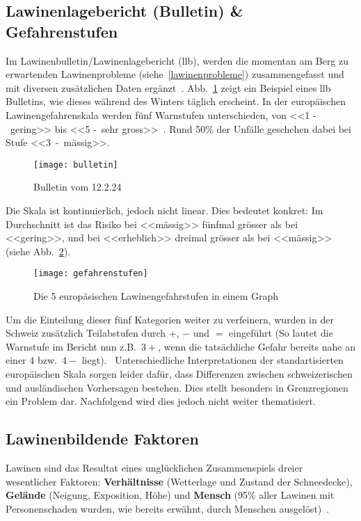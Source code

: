\subsection{Lawinenlagebericht (Bulletin) \& Gefahrenstufen}

Im Lawinenbulletin/Lawinenlagebericht (\gls{llb}), werden die momentan am Berg zu erwartenden Lawinenprobleme (siehe~\ref{lawinenprobleme}) zusammengefasst und mit diversen zusätzlichen Daten ergänzt~\cite{lawinengefskala}.
Abb.\ \ref{fig:bulletin} zeigt ein Beispiel eines \gls{llb} Bulletins, wie dieses während des Winters täglich erscheint.
In der europäischen Lawinengefahrenskala werden fünf Warnstufen unterschieden, von <<1 -~gering>> bis <<5 -~sehr gross>>~\cite{harveyrhynerschweizerlawinenkunde}\cite{lawinengefskala}.
Rund 50\% der Unfälle geschehen dabei bei Stufe <<3~-~mässig>>.~\cite{achtunglawine}
\begin{figure}[H]
  \centering
  \texttt{[image: bulletin]}
  \caption{Bulletin vom 12.2.24~\cite{slfarchiv}}\label{fig:bulletin}
\end{figure}
Die Skala ist kontinuierlich, jedoch nicht linear. Dies bedeutet konkret: 
Im Durchschnitt ist das Risiko bei <<mässig>> fünfmal grösser als bei <<gering>>, und bei <<erheblich>> dreimal grösser als bei <<mässig>>~\cite{sacbergspwinter} (siehe Abb.\ \ref{fig:llbdanger}).
\begin{figure}[H]
  \centering
  \texttt{[image: gefahrenstufen]}
  \caption{Die 5 europäsischen Lawinengefahrstufen in einem Graph}\label{fig:llbdanger}
\end{figure}
Um die Einteilung dieser fünf Kategorien weiter zu verfeinern, wurden in der Schweiz zusätzlich Teilabstufen durch $+$, $-$ und $=$ eingeführt (So lautet die Warnstufe im Bericht nun z.B.\ $3+$, wenn die tatsächliche Gefahr bereits nahe an einer $4$ bzw.\ $4-$ liegt).~\cite{sacbergspwinter}
Unterschiedliche Interpretationen der standartisierten europäischen Skala sorgen leider dafür, dass Differenzen zwischen schweizerischen und ausländischen Vorhersagen bestehen. Dies stellt besonders in Grenzregionen ein Problem dar. Nachfolgend wird dies jedoch nicht weiter thematisiert.


\subsection{Lawinenbildende Faktoren}

Lawinen sind das Resultat eines unglücklichen Zusammenspiels dreier wesentlicher Faktoren: 
\textbf{Verhältnisse} (Wetterlage und Zustand der Schneedecke), \textbf{Gelände} (Neigung, Exposition, Höhe) und \textbf{Mensch} (95\% aller Lawinen mit Personenschaden wurden, wie bereits erwähnt, durch Menschen ausgelöst)~\cite{ortovoxlabsnow}.

